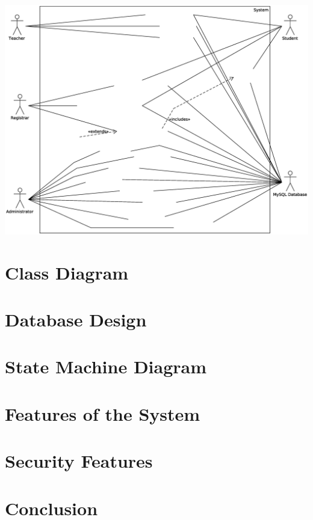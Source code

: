 \documentclass[12pt,a4paper,oneside,draft]{article}
\begin{document}
\includegraphics[width=\linewidth]{umlUseCase}






\section{Class Diagram}

\section{Database Design}

\section{State Machine Diagram}

\section{Features of the System}

\section{Security Features}

\section{Conclusion}
\end{document}
